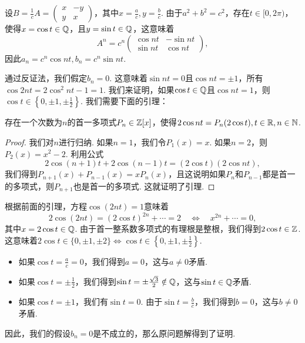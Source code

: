 \begin{solution}
  设$B=\frac1cA=\begin{pmatrix}
    x & -y\\
    y & x
  \end{pmatrix}$，其中$x=\frac ac,y=\frac bc$. 由于$a^2+b^2=c^2$，存在$t\in[0,2\pi)$，使得$x=\cos t\in\mathbb Q$，且$y=\sin t\in\mathbb Q$，这意味着
  \[
    A^n = c^n\begin{pmatrix}
      \cos nt & -\sin nt\\
      \sin nt & \cos nt
    \end{pmatrix},
  \]
  因此$a_n=c^n\cos nt,b_n=c^n\sin nt$.

  通过反证法，我们假定$b_n=0$. 这意味着$\sin nt=0$且$\cos nt=\pm1$，所有$\cos 2nt=2\cos^2nt-1=1$. 我们来证明，如果$\cos t\in\mathbb Q$且$\cos nt=1$，则$\cos t\in\left\{0,\pm1,\pm\frac12\right\}$. 我们需要下面的引理：
  \begin{mybox}
    \begin{lemma}
      存在一个次数为$n$的首一多项式$P_n\in\mathbb Z[x]$，使得$2\cos nt=P_n(2\cos t),t\in\mathbb R,n\in\mathbb N$.
    \end{lemma}
  \end{mybox}
  \begin{proof}
    我们对$n$进行归纳. 如果$n=1$，我们令$P_1(x)=x$. 如果$n=2$，则$P_2(x)=x^2-2$. 利用公式
    \[
      2\cos(n+1)t + 2\cos(n-1)t = (2\cos t)(2\cos nt),
    \]
    我们得到$P_{n+1}(x)+P_{n-1}(x)=xP_n(x)$，且这说明如果$P_n$和$P_{n-1}$都是首一的多项式，则$P_{n+1}$也是首一的多项式. 这就证明了引理.
  \end{proof}

  根据前面的引理，方程$\cos(2nt)=1$意味着
  \[
    2\cos(2nt) = (2\cos t)^{2n} + \cdots = 2\quad \Leftrightarrow\quad x^{2n}+\cdots = 0,
  \]
  其中$x=2\cos t\in\mathbb Q$. 由于首一整系数多项式的有理根是整根，我们得到$2\cos t\in\mathbb Z$. 这意味着$2\cos t\in\{0,\pm1,\pm2\}\Leftrightarrow \cos t\in\left\{0,\pm1,\pm\frac12\right\}$.

  \begin{itemize}
    \item 如果$\cos t=\frac ac=0$，我们得到$a=0$，这与$a\ne0$矛盾.
    \item 如果$\cos t=\pm\frac12$，我们得到$\sin t=\pm\frac{\sqrt3}2\notin\mathbb Q$，这与$\sin t\in\mathbb Q$矛盾.
    \item 如果$\cos t=\pm1$，我们有$\sin t=0$. 由于$\sin t=\frac bc$，我们得到$b=0$，这与$b\ne0$矛盾.
  \end{itemize}
  因此，我们的假设$b_n=0$是不成立的，那么原问题解得到了证明.
\end{solution}


